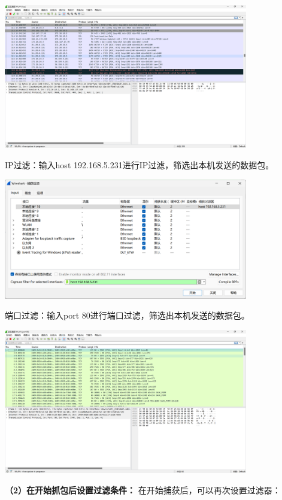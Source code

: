 \documentclass{article}
\begin{document}
\vspace{10pt}
\centerline{\includegraphics[width=0.8\textwidth]{1_1_images/2.png}}
\vspace{10pt}
IP过滤：输入host 192.168.5.231进行IP过滤，筛选出本机发送的数据包。

\vspace{10pt}
\centerline{\includegraphics[width=0.8\textwidth]{1_1_images/3.png}}
\vspace{10pt}
端口过滤：输入port 80进行端口过滤，筛选出本机发送的数据包。

\vspace{10pt}
\centerline{\includegraphics[width=0.8\textwidth]{1_1_images/4.png}}
\vspace{10pt}

\textbf{（2）在开始抓包后设置过滤条件：}
在开始捕获后，可以再次设置过滤器：
\end{document}
